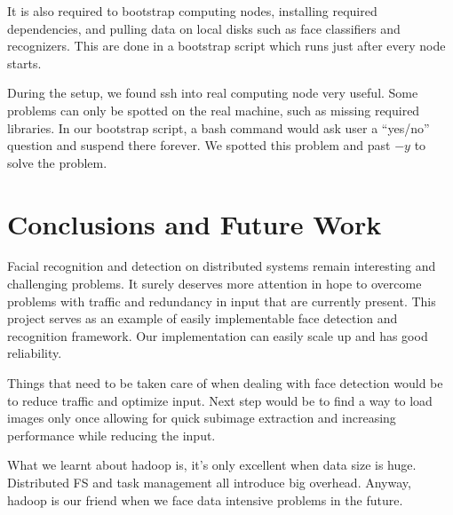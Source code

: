 \documentclass[11pt, draftclsnofoot, onecolumn]{IEEEtran}
\begin{document}
It is also required to bootstrap computing nodes, installing required dependencies, and pulling data on local disks such as face classifiers and recognizers. This are done in a bootstrap script which runs just after every node starts. 

During the setup, we found ssh into real computing node very useful. Some problems can only be spotted on the real machine, such as missing required libraries. In our bootstrap script, a bash command would ask user a “yes/no” question and suspend there forever. We spotted this problem and past $-y$ to solve the problem. 

\section{Conclusions and Future Work} \label{sec:conclusion}

Facial recognition and detection on distributed systems remain interesting and challenging problems. It surely deserves more attention in hope to overcome problems with traffic and redundancy in input that are currently present. This project serves as an example of easily implementable face detection and recognition framework. Our implementation can easily scale up and has good reliability. 

Things that need to be taken care of when dealing with face detection would be to reduce traffic and optimize input. Next step would be to find a way to load images only once allowing for quick subimage extraction and increasing performance while reducing the input.

What we learnt about hadoop is, it’s only excellent when data size is huge. Distributed FS and task management all introduce big overhead. Anyway, hadoop is our friend when we face data intensive problems in the future. 

   
\end{document}
